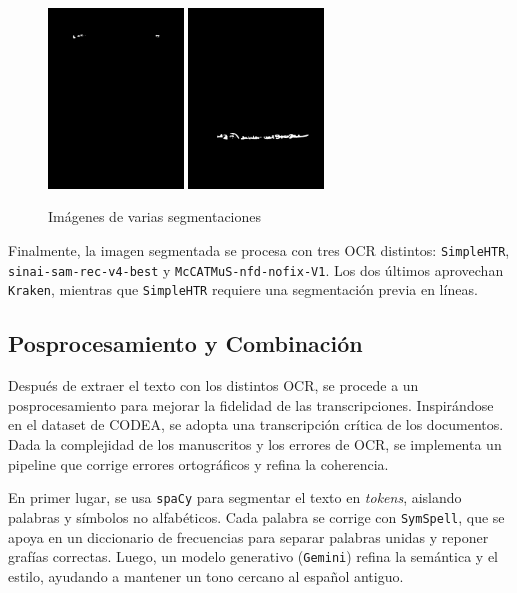 \documentclass[11pt,a4paper]{article}
\begin{document}
\begin{figure}[h] 
\centering 
\begin{minipage}{1.0\textwidth} 
\includegraphics[width=0.32\textwidth]{mask_2.png} 
\includegraphics[width=0.32\textwidth]{mask_22.png} 
\caption{Imágenes de varias segmentaciones} 
\label{fig:sam 2} 
\end{minipage} 
\end{figure}

Finalmente, la imagen segmentada se procesa con tres OCR distintos: \texttt{SimpleHTR}, \texttt{sinai-sam-rec-v4-best} y \texttt{McCATMuS-nfd-nofix-V1}. Los dos últimos aprovechan \texttt{Kraken}, mientras que \texttt{SimpleHTR} requiere una segmentación previa en líneas.

\subsection{Posprocesamiento y Combinación}

Después de extraer el texto con los distintos OCR, se procede a un posprocesamiento para mejorar la fidelidad de las transcripciones. Inspirándose en el dataset de CODEA, se adopta una transcripción crítica de los documentos. Dada la complejidad de los manuscritos y los errores de OCR, se implementa un pipeline que corrige errores ortográficos y refina la coherencia.

En primer lugar, se usa \texttt{spaCy} para segmentar el texto en \textit{tokens}, aislando palabras y símbolos no alfabéticos. Cada palabra se corrige con \texttt{SymSpell}, que se apoya en un diccionario de frecuencias para separar palabras unidas y reponer grafías correctas. Luego, un modelo generativo (\texttt{Gemini}) refina la semántica y el estilo, ayudando a mantener un tono cercano al español antiguo.
\end{document}
